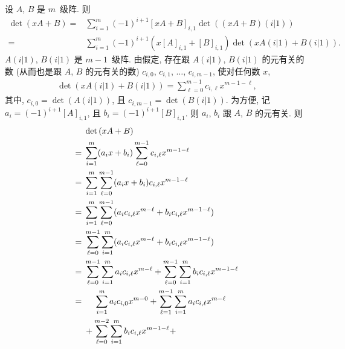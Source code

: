 \documentclass[../libro.tex]{subfiles}
\begin{document}
\begin{example}
    设 \(A\), \(B\) 是 \(m\)~级阵.
    则
    \begin{align*}
        \det {(xA + B)}
        = {} &
        \sum_{i = 1}^{m}
        (-1)^{i+1} [xA + B]_{i,1} \det {((xA + B)(i|1))}
        \\
        = {} &
        \sum_{i = 1}^{m}
        (-1)^{i+1} (x [A]_{i,1} + [B]_{i,1})
        \det {(x A(i|1) + B(i|1))}.
    \end{align*}
    \(A(i|1)\), \(B(i|1)\) 是 \(m-1\)~级阵.
    由假定, 存在跟 \(A(i|1)\), \(B(i|1)\) 的元有关的数
    (从而也是跟 \(A\), \(B\) 的元有关的数)
    \(c_{i,0}\), \(c_{i,1}\), \(\dots\), \(c_{i,m-1}\),
    使对任何数 \(x\),
    \begin{align*}
        \det {(x A(i|1) + B(i|1))}
        = \sum_{\ell = 0}^{m-1}
        c_{i,\ell} x^{m-1-\ell},
    \end{align*}
    其中, \(c_{i,0} = \det {(A(i|1))}\),
    且 \(c_{i,m-1} = \det {(B(i|1))}\).
    为方便, 记 \(a_i = (-1)^{i+1} [A]_{i,1}\),
    且 \(b_i = (-1)^{i+1} [B]_{i,1}\).
    则 \(a_i\), \(b_i\) 跟 \(A\), \(B\) 的元有关.
    则
    \begin{align*}
        &
        \det {(xA + B)}
        \\
        = {} &
        \sum_{i = 1}^{m}
        (a_i x + b_i)
        \sum_{\ell = 0}^{m-1}
        c_{i,\ell} x^{m-1-\ell}
        \\
        = {} &
        \sum_{i = 1}^{m}
        \sum_{\ell = 0}^{m-1}
        (a_i x + b_i)
        c_{i,\ell} x^{m-1-\ell}
        \\
        = {} &
        \sum_{i = 1}^{m}
        \sum_{\ell = 0}^{m-1}
        (a_i c_{i,\ell} x^{m-\ell}
        + b_i c_{i,\ell} x^{m-1-\ell})
        \\
        = {} &
        \sum_{\ell = 0}^{m-1}
        \sum_{i = 1}^{m}
        (a_i c_{i,\ell} x^{m-\ell}
        + b_i c_{i,\ell} x^{m-1-\ell})
        \\
        = {} &
        \sum_{\ell = 0}^{m-1}
        \sum_{i = 1}^{m}
        a_i c_{i,\ell} x^{m-\ell}
        +
        \sum_{\ell = 0}^{m-1}
        \sum_{i = 1}^{m}
        b_i c_{i,\ell} x^{m-1-\ell}
        \\
        = {} & \hphantom{{} + {}}
        \sum_{i = 1}^{m}
        a_i c_{i,0} x^{m-0}
        +
        \sum_{\ell = 1}^{m-1}
        \sum_{i = 1}^{m}
        a_i c_{i,\ell} x^{m-\ell}
        \\
        &
        +
        \sum_{\ell = 0}^{m-2}
        \sum_{i = 1}^{m}
        b_i c_{i,\ell} x^{m-1-\ell}
        +

\end{align*}
\end{example}
\end{document}
